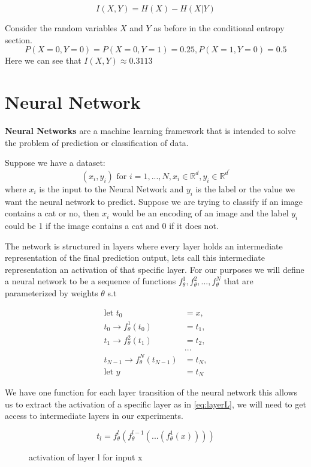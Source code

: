 \begin{equation}
  I(X, Y) = H(X) - H(X|Y)
\label{eq:miEntropy}
\end{equation}

Consider the random variables $X$ and $Y$ as before in the conditional entropy
section. 
$$P(X=0,Y=0) = P(X=0,Y=1) = 0.25, P(X=1,Y=0) = 0.5$$
Here we can see that $I(X,Y) \approx 0.3113$

\section{Neural Network}

\textbf{Neural Networks} are a machine learning framework that is intended to
solve the problem of prediction or classification of data. 

Suppose we have a dataset:
$$ (x_i, y_i) \text{ for } i = 1,...,N, x_i \in \mathbb{R}^d, y_i \in \mathbb{R}^{d^\prime}$$ 
where $x_i$ is the input to the Neural Network and $y_i$ is the label or the
value we want the neural network to predict. Suppose we are trying to classify
if an image contains a cat or no, then $x_i$ would be an encoding of an image
and the label $y_i$ could be 1 if the image contains a cat and 0 if it does not.

The network is structured in layers where every layer holds an intermediate
representation of the final prediction output, lets call this intermediate
representation an activation of that specific layer. For our purposes we will
define a neural network to be a sequence of functions
$f_{\theta}^1,f_{\theta}^2,... ,f_{\theta}^N$ that are parameterized by weights
$\theta$ s.t

\begin{align*}
  \text{let } t_0 &= x, \\
    t_0 \rightarrow f_{\theta}^1(t_0) &= t_1,\\
    t_1 \rightarrow f_{\theta}^2(t_1) &= t_2,\\
    &...\\
    t_{N-1} \rightarrow f_{\theta}^N(t_{N-1}) &= t_N,\\
    \text{let } y &= t_N
\end{align*}

We have one function for each layer transition of the neural network this allows
us to extract the activation of a specific layer as in \autoref{eq:layerL}, we
will need to get access to intermediate layers in our experiments.

\begin{figure}[H]
  \[ t_l = f_{\theta}^l(f_{\theta}^{l-1}(...(f_{\theta}^1(x)))) \]
  \caption{activation of layer l for input x}
  \label{eq:layerL}
\end{figure}

